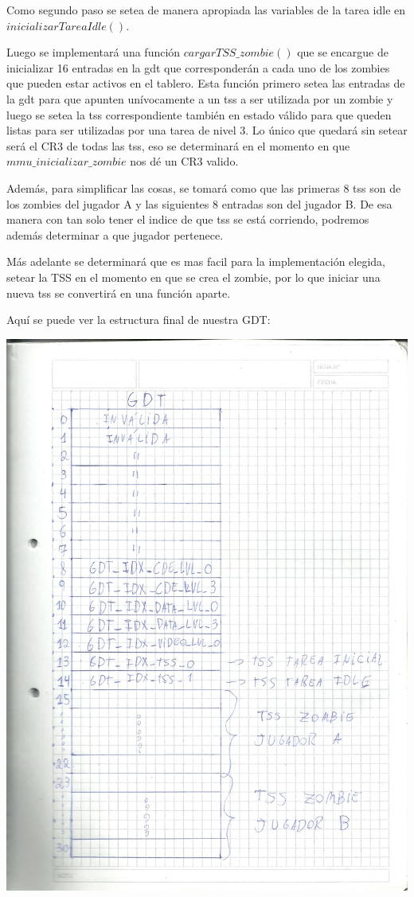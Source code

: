 \documentclass[a4paper]{article}
\begin{document}
Como segundo paso se setea de manera apropiada las variables de la tarea idle en $inicializarTareaIdle()$.

Luego se implementará una función $cargarTSS\_ zombie()$ que se encargue de inicializar 16 entradas en la gdt que corresponderán a cada uno de los zombies que pueden estar activos en el tablero. Esta función primero setea las entradas de la gdt para que apunten unívocamente a un tss a ser utilizada por un zombie y luego se setea la tss correspondiente también en estado válido para que queden listas para ser utilizadas por una tarea de nivel 3. Lo único que quedará sin setear será el CR3 de todas las tss, eso se determinará en el momento en que $mmu\_ inicializar\_ zombie$ nos dé un CR3 valido.

Además, para simplificar las cosas, se tomará como que las primeras 8 tss son de los zombies del jugador A y las siguientes 8 entradas son del jugador B. De esa manera con tan solo tener el indice de que tss se está corriendo, podremos además determinar a que jugador pertenece.

Más adelante se determinará que es mas facil para la implementación elegida, setear la TSS en el momento en que se crea el zombie, por lo que iniciar una nueva tss se convertirá en una función aparte.

Aquí se puede ver la estructura final de nuestra GDT:

\includegraphics[scale=0.7]{dibujos/dibujo4.jpg}\\
\end{document}

